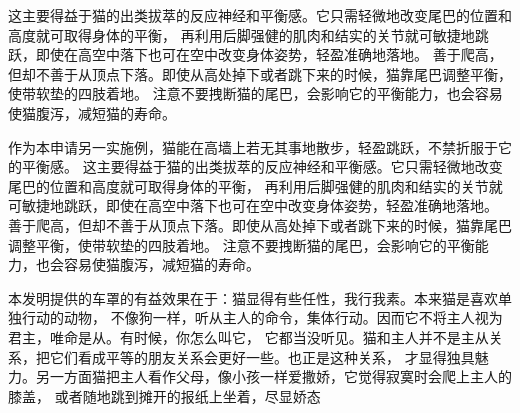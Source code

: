 {\begin{large}
        这主要得益于猫的出类拔萃的反应神经和平衡感。它只需轻微地改变尾巴的位置和高度就可取得身体的平衡，
        再利用后脚强健的肌肉和结实的关节就可敏捷地跳跃，即使在高空中落下也可在空中改变身体姿势，轻盈准确地落地。
        善于爬高，但却不善于从顶点下落。即使从高处掉下或者跳下来的时候，猫靠尾巴调整平衡，使带软垫的四肢着地。
        注意不要拽断猫的尾巴，会影响它的平衡能力，也会容易使猫腹泻，减短猫的寿命。
        \par 作为本申请另一实施例，猫能在高墙上若无其事地散步，轻盈跳跃，不禁折服于它的平衡感。
        这主要得益于猫的出类拔萃的反应神经和平衡感。它只需轻微地改变尾巴的位置和高度就可取得身体的平衡，
        再利用后脚强健的肌肉和结实的关节就可敏捷地跳跃，即使在高空中落下也可在空中改变身体姿势，轻盈准确地落地。
        善于爬高，但却不善于从顶点下落。即使从高处掉下或者跳下来的时候，猫靠尾巴调整平衡，使带软垫的四肢着地。
        注意不要拽断猫的尾巴，会影响它的平衡能力，也会容易使猫腹泻，减短猫的寿命。
        \par 本发明提供的车罩的有益效果在于：猫显得有些任性，我行我素。本来猫是喜欢单独行动的动物，
        不像狗一样，听从主人的命令，集体行动。因而它不将主人视为君主，唯命是从。有时候，你怎么叫它，
        它都当没听见。猫和主人并不是主从关系，把它们看成平等的朋友关系会更好一些。也正是这种关系，
        才显得独具魅力。另一方面猫把主人看作父母，像小孩一样爱撒娇，它觉得寂寞时会爬上主人的膝盖，
        或者随地跳到摊开的报纸上坐着，尽显娇态

    \end{large}
}

\newcommand{\descpic}{
    \begin{large}
        如图1是一只狸花猫，原产于中国，属于自然猫，在宋朝有“狸猫换太子”的故事，
        因此是千百年来经过自然淘汰而保留下来的品种。此猫头圆，面颊宽大，被毛上有漂亮的斑纹，特别容易喂养，并对捕捉老鼠十分在行
    \end{large}
}

\newcommand{\execution}{
    \begin{large}
        附图仅用于示例性说明，不能理解为对本专利的限制；
        为了更好说明本实施例，附图某些部件会有省略、放大或缩小，并不代表实际产品的尺寸；
        对于本领域技术人员来说，附图中某些公知结构及其说明可能省略是可以理解的。
        下面结合附图和实施例对本发明的技术方案做进一步的说明。

        实施例1
        如图1所示，这是一只狸花猫，原产于中国，属于自然猫，在宋朝有“狸猫换太子”的故事，
        因此是千百年来经过自然淘汰而保留下来的品种。此猫头圆，面颊宽大，被毛上有漂亮的斑纹，特别容易喂养，并对捕捉老鼠十分在行

    \end{large}
}